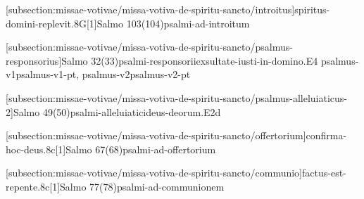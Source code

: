 \def\Prefix{subsection:missae-votivae/missa-votiva-de-spiritu-sancto}

[\Prefix/introitus]{spiritus-domini-replevit.8G}[1]{Salmo 103(104)}{psalmi-ad-introitum}

\AllowPageFlush

[\Prefix/psalmus-responsorius]{Salmo 32(33)}{psalmi-responsorii}{exsultate-iusti-in-domino.E4}{
  {psalmus-v1}{psalmus-v1-pt},
  {psalmus-v2}{psalmus-v2-pt}
}

\AllowPageFlush

[\Prefix/psalmus-alleluiaticus-2]{Salmo 49(50)}{psalmi-alleluiatici}{deus-deorum.E2d}

\AllowPageFlush

[\Prefix/offertorium]{confirma-hoc-deus.8c}[1]{Salmo 67(68)}{psalmi-ad-offertorium}

\AllowPageFlush

[\Prefix/communio]{factus-est-repente.8c}[1]{Salmo 77(78)}{psalmi-ad-communionem}